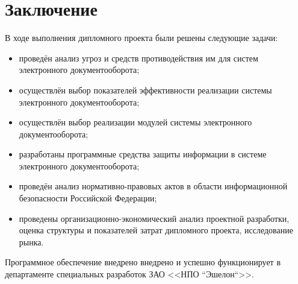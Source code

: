\chapter*{Заключение}						%

В ходе выполнения дипломного проекта были решены следующие задачи:
\begin{itemize}
	\item проведён анализ угроз и средств противодействия им для систем электронного документооборота;
	\item осуществлён выбор показателей эффективности реализации системы электронного документооборота;
	\item осуществлён выбор реализации модулей системы электронного документооборота;
	\item разработаны программные средства защиты информации в системе электронного документооборота;
	\item проведён анализ нормативно-правовых актов в области информационной безопасности Российской Федерации;
	\item проведены организационно-экономический анализ проектной разработки, оценка структуры и показателей затрат дипломного проекта, исследование рынка.
\end{itemize}

\vspace{\baselineskip}
Программное обеспечение внедрено внедрено и успешно функционирует в департаменте специальных разработок ЗАО <<НПО ``Эшелон``>>.


\clearpage